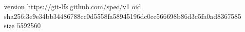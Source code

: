 version https://git-lfs.github.com/spec/v1
oid sha256:3e9e34bb34486788cc0d5558fa58945196dc0cc566698b86d3c5fa0ad8367585
size 5592560
